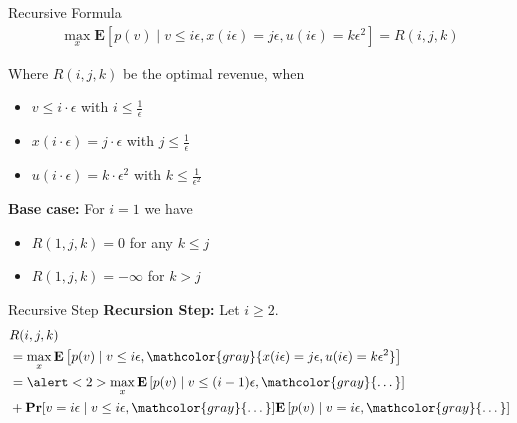 \documentclass{beamer}
\begin{document}
\begin{frame}{Recursive Formula}
  \begin{align*}
    \max_x \mathbf{E}[p(v) \mid v \leq i \epsilon, x(i\epsilon) = j\epsilon, u(i\epsilon) = k\epsilon^2] = R(i,j,k)
  \end{align*}

  Where $R(i,j,k)$ be the optimal revenue, when
  \begin{itemize}
    \item $v \leq i \cdot \epsilon$ with $i \leq \frac{1}{\epsilon}$
    \item $x(i \cdot \epsilon) = j \cdot \epsilon$ with $j \leq \frac{1}{\epsilon}$
    \item $u(i \cdot \epsilon) = k \cdot \epsilon^2$ with $k \leq \frac{1}{\epsilon^2}$
  \end{itemize}

  \textbf{Base case:}
  For $i = 1$ we have
  \begin{itemize}
    \item $R(1,j,k) = 0$ for any $k \leq j$
    \item $R(1,j,k) = -\infty$ for $k > j$
  \end{itemize}
\end{frame}

\begin{frame}{Recursive Step}
  \textbf{Recursion Step:}
  Let $i \geq 2$.
  \begin{align*}
     & R(i,j,k)                                                                                                                                               \\
     & = \max_x \mathbf{E}\left[p(v) \mid v \leq i \epsilon, \mathcolor{gray}{x(i\epsilon) = j\epsilon, u(i\epsilon) = k\epsilon^2}\right]                    \\
     & = \alert<2>{\max_x \mathbf{E}\left[p(v) \mid v \leq (i - 1) \epsilon, \mathcolor{gray}{\dots} \right]}                                                 \\
     & + \mathbf{Pr}[v = i\epsilon \mid v \leq i \epsilon, \mathcolor{gray}{\dots} ] \mathbf{E}\left[p(v) \mid v = i\epsilon, \mathcolor{gray}{\dots} \right]
  \end{align*}
\end{frame}
\end{document}
